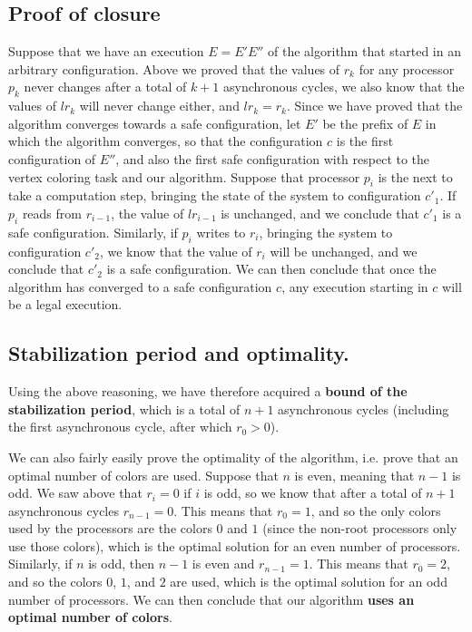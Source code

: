 \documentclass{article}
\begin{document}
\subsection*{Proof of closure}
Suppose that we have an execution $E = E'E''$ of the algorithm that started in an arbitrary configuration. Above we proved that the values of $r_k$ for any processor $p_k$ never changes after a total of $k + 1$ asynchronous cycles, we also know that the values of $lr_{k}$ will never change either, and $lr_k = r_k$. Since we have proved that the algorithm converges towards a safe configuration, let $E'$ be the prefix of $E$ in which the algorithm converges, so that the configuration $c$ is the first configuration of $E''$, and also the first safe configuration with respect to the vertex coloring task and our algorithm. Suppose that processor $p_i$ is the next to take a computation step, bringing the state of the system to configuration $c'_1$. If $p_i$ reads from $r_{i - 1}$, the value of $lr_{i - 1}$ is unchanged, and we conclude that $c'_1$ is a safe configuration. Similarly, if $p_i$ writes to $r_i$, bringing the system to configuration $c'_2$, we know that the value of $r_i$ will be unchanged, and we conclude that $c'_2$ is a safe configuration. We can then conclude that once the algorithm has converged to a safe configuration $c$, any execution starting in $c$ will be a legal execution.

\subsection*{Stabilization period and optimality.}
Using the above reasoning, we have therefore acquired a \textbf{bound of the stabilization period}, which is a total of $n + 1$ asynchronous cycles (including the first asynchronous cycle, after which $r_0 > 0$).

We can also fairly easily prove the optimality of the algorithm, i.e. prove that an optimal number of colors are used. Suppose that $n$ is even, meaning that $n - 1$ is odd. We saw above that $r_i = 0$ if $i$ is odd, so we know that after a total of $n + 1$ asynchronous cycles $r_{n - 1} = 0$. This means that $r_0 = 1$, and so the only colors used by the processors are the colors $0$ and $1$ (since the non-root processors only use those colors), which is the optimal solution for an even number of processors. Similarly, if $n$ is odd, then $n - 1$ is even and $r_{n - 1} = 1$. This means that $r_0 = 2$, and so the colors $0$, $1$, and $2$ are used, which is the optimal solution for an odd number of processors. We can then conclude that our algorithm \textbf{uses an optimal number of colors}.
\end{document}

